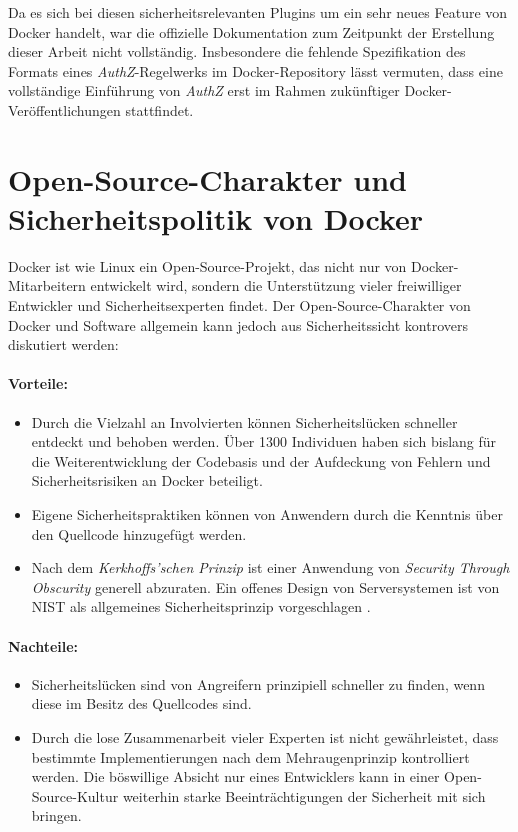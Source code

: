 \documentclass[../main.tex]{subfiles}
\begin{document}
    Da es sich bei diesen sicherheitsrelevanten Plugins um ein sehr neues Feature von Docker handelt, war die offizielle Dokumentation zum Zeitpunkt der Erstellung dieser Arbeit nicht vollständig. Insbesondere die fehlende Spezifikation des Formats eines \emph{AuthZ}-Regelwerks im Docker-Repository lässt vermuten, dass eine vollständige Einführung von \emph{AuthZ} erst im Rahmen zukünftiger Docker-Veröffentlichungen stattfindet.

  \clearpage

  \section{Open-Source-Charakter und Sicherheitspolitik von Docker}
  \label{opensource}
    Docker ist wie Linux ein Open-Source-Projekt, das nicht nur von Docker-Mitarbeitern entwickelt wird, sondern die Unterstützung vieler freiwilliger Entwickler und Sicherheitsexperten findet. Der Open-Source-Charakter von Docker und Software allgemein kann jedoch aus Sicherheitssicht kontrovers diskutiert werden:

    \paragraph{Vorteile:}
    \begin{itemize}
      \item Durch die Vielzahl an Involvierten können Sicherheitslücken schneller entdeckt und behoben werden. Über 1300 Individuen haben sich bislang für die Weiterentwicklung der Codebasis und der Aufdeckung von Fehlern und Sicherheitsrisiken an Docker beteiligt.
      \item Eigene Sicherheitspraktiken können von Anwendern durch die Kenntnis über den Quellcode hinzugefügt werden.
      \item Nach dem \emph{Kerkhoffs'schen Prinzip} ist einer Anwendung von \emph{Security Through Obscurity} generell abzuraten. Ein offenes Design von Serversystemen ist von NIST als allgemeines Sicherheitsprinzip vorgeschlagen \cite[S.15]{nist}.
    \end{itemize}

    \paragraph{Nachteile:}
    \begin{itemize}
      \item Sicherheitslücken sind von Angreifern prinzipiell schneller zu finden, wenn diese im Besitz des Quellcodes sind.
      \item Durch die lose Zusammenarbeit vieler Experten ist nicht gewährleistet, dass bestimmte Implementierungen nach dem Mehraugenprinzip kontrolliert werden. Die böswillige Absicht nur eines Entwicklers kann in einer Open-Source-Kultur weiterhin starke Beeinträchtigungen der Sicherheit mit sich bringen.
    \end{itemize}
\end{document}
